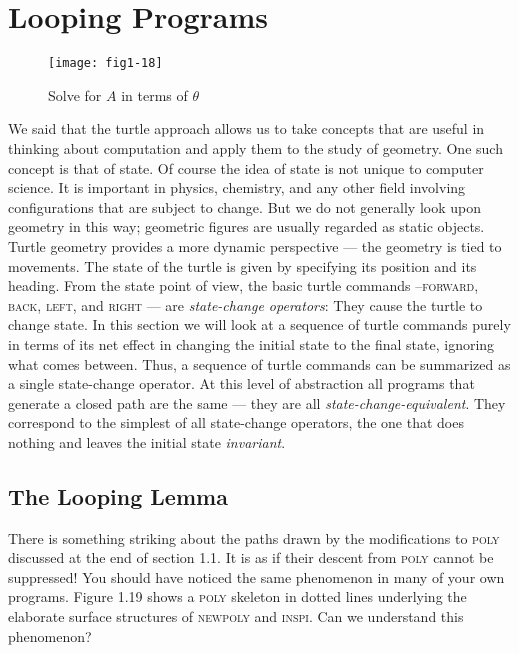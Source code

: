 \documentclass{book}
\begin{document}
\section{Looping Programs}


\begin{figure}
\begin{center}
\texttt{[image: fig1-18]}
\caption{Solve for $A$ in terms of $\theta$}
\end{center}
\end{figure}


We said that the turtle approach allows us to take concepts that are
useful in thinking about computation and apply them to the study of
geometry. One such concept is that of state. Of course the idea of state
is not unique to computer science. It is important in physics, chemistry,
and any other field involving configurations that are subject to change.
But we do not generally look upon geometry in this way; geometric
figures are usually regarded as static objects. Turtle geometry provides
a more dynamic perspective --- the geometry is tied to movements.
The state of the turtle is given by specifying its position and its
heading. From the state point of view, the basic turtle commands --\textsc{forward}, \textsc{back}, \textsc{left}, and \textsc{right} --- are {\em state-change operators}: They
cause the turtle to change state. In this section we will look at a sequence
of turtle commands purely in terms of its net effect in changing the initial
state to the final state, ignoring what comes between. Thus, a sequence
of turtle commands can be summarized as a single state-change operator.
At this level of abstraction all programs that generate a closed path are
the same --- they are all {\em state-change-equivalent}. They correspond to the
simplest of all state-change operators, the one that does nothing and
leaves the initial state {\em invariant}.

\subsection{The Looping Lemma}



There is something striking about the paths drawn by the modifications
to \textsc{poly} discussed at the end of section 1.1. It is as if their descent
from \textsc{poly} cannot be suppressed! You should have noticed the same
phenomenon in many of your own programs. Figure 1.19 shows a \textsc{poly}
skeleton in dotted lines underlying the elaborate surface structures of
\textsc{newpoly} and \textsc{inspi}. Can we understand this phenomenon?
\end{document}
